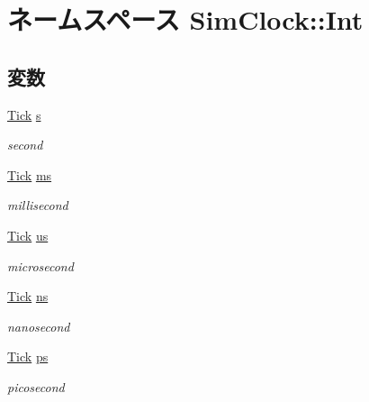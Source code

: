 \hypertarget{namespaceSimClock_1_1Int}{
\section{ネームスペース SimClock::Int}
\label{namespaceSimClock_1_1Int}
}
\subsection*{変数}
\begin{DoxyCompactItemize}
\item 
\hyperlink{base_2types_8hh_a5c8ed81b7d238c9083e1037ba6d61643}{Tick} \hyperlink{namespaceSimClock_1_1Int_a747b4704194d75d03891708cbba227b7}{s}
\begin{DoxyCompactList}\small\item\em second \item\end{DoxyCompactList}\item 
\hyperlink{base_2types_8hh_a5c8ed81b7d238c9083e1037ba6d61643}{Tick} \hyperlink{namespaceSimClock_1_1Int_ac4888dd8ac1c3bbc038feb1b22a411bc}{ms}
\begin{DoxyCompactList}\small\item\em millisecond \item\end{DoxyCompactList}\item 
\hyperlink{base_2types_8hh_a5c8ed81b7d238c9083e1037ba6d61643}{Tick} \hyperlink{namespaceSimClock_1_1Int_a5d9982f5170bf420523d942720c32d8c}{us}
\begin{DoxyCompactList}\small\item\em microsecond \item\end{DoxyCompactList}\item 
\hyperlink{base_2types_8hh_a5c8ed81b7d238c9083e1037ba6d61643}{Tick} \hyperlink{namespaceSimClock_1_1Int_a370bc05be45c1b9f039369ffd5c0efd4}{ns}
\begin{DoxyCompactList}\small\item\em nanosecond \item\end{DoxyCompactList}\item 
\hyperlink{base_2types_8hh_a5c8ed81b7d238c9083e1037ba6d61643}{Tick} \hyperlink{namespaceSimClock_1_1Int_a9f647c4d124b807dbc6569248ce7f3aa}{ps}
\begin{DoxyCompactList}\small\item\em picosecond \item\end{DoxyCompactList}\end{DoxyCompactItemize}


